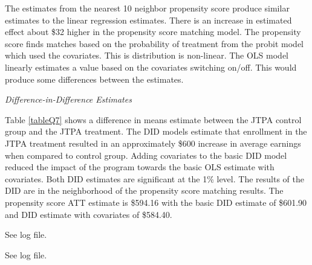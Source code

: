 \documentclass[12pt]{article}
\begin{document}
    \begin{list}{}{}
        \item The estimates from the nearest 10 neighbor propensity score 
        produce similar estimates to the linear regression estimates. There is an 
        increase in estimated effect about \$32 higher in the propensity 
        score matching model.  The propensity score finds matches based on the 
        probability of treatment from the probit model which used the covariates. 
        This is distribution is non-linear. The OLS model linearly estimates a 
        value based on the covariates switching on/off. This would produce some
        differences between the estimates. 
    \end{list}

    \begin{list}{}{}
        \item 
        \begin{table}[h!]
            \centering
            \caption{\textit{Difference-in-Difference Estimates} }
            \label{tableQ7}
        \end{table}
    \end{list}

\begin{list}{}{}
    \item Table \ref{tableQ7} shows a difference in means estimate between the 
    JTPA control group and the JTPA treatment. The DID models estimate that 
    enrollment in the JTPA treatment resulted in an approximately \$600 increase 
    in average earnings when compared to control group. Adding covariates to 
    the basic DID model reduced the impact of the program towards the basic OLS 
    estimate with covariates. Both DID estimates are significant at the 1\% 
    level. The results of the DID are in the neighborhood of 
    the propensity score matching results. The propensity score ATT estimate is 
    \$594.16 with the basic DID estimate of \$601.90 and DID estimate with 
    covariates of \$584.40.
\end{list}

\begin{list}{}{}
    \item See log file.
\end{list}

\begin{list}{}{}
    \item See log file.
\end{list}
\end{document}
